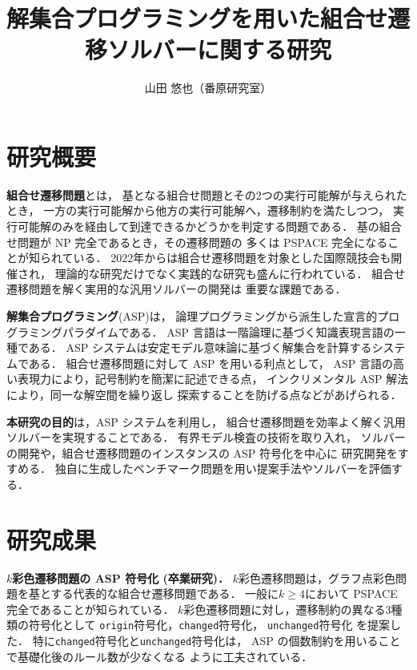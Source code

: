 \documentclass[a4j,10pt]{jarticle}
\title{解集合プログラミングを用いた組合せ遷移ソルバーに関する研究}
\author{山田 悠也（番原研究室）}
\date{}
\newcommand{\code}[1]{\lstinline[basicstyle=\ttfamily]{#1}}
\begin{document}
\maketitle
\thispagestyle{empty}
\begin{multicols}{1}

\section{研究概要}
\textbf{組合せ遷移問題}とは，
基となる組合せ問題とその2つの実行可能解が与えられたとき，
一方の実行可能解から他方の実行可能解へ，遷移制約を満たしつつ，
実行可能解のみを経由して到達できるかどうかを判定する問題である．
基の組合せ問題が NP 完全であるとき，その遷移問題の
多くは PSPACE 完全になることが知られている．
2022年からは組合せ遷移問題を対象とした国際競技会も開催され，
理論的な研究だけでなく実践的な研究も盛んに行われている．
組合せ遷移問題を解く実用的な汎用ソルバーの開発は
重要な課題である．

\textbf{解集合プログラミング}(ASP)は，
論理プログラミングから派生した宣言的プログラミングパラダイムである．
ASP 言語は一階論理に基づく知識表現言語の一種である．
ASP システムは安定モデル意味論に基づく解集合を計算するシステムである．
組合せ遷移問題に対して ASP を用いる利点として，
ASP 言語の高い表現力により，記号制約を簡潔に記述できる点，
インクリメンタル ASP 解法により，同一な解空間を繰り返し
探索することを防げる点などがあげられる．

\textbf{本研究の目的}は，ASP システムを利用し，
組合せ遷移問題を効率よく解く汎用ソルバーを実現することである．
有界モデル検査の技術を取り入れ，
ソルバーの開発や，組合せ遷移問題のインスタンスの ASP 符号化を中心に
研究開発をすすめる．
独自に生成したベンチマーク問題を用い提案手法やソルバーを評価する．

\section{研究成果}
\textbf{$k$彩色遷移問題の ASP 符号化 (卒業研究)．}
$k$彩色遷移問題は，グラフ点彩色問題を基とする代表的な組合せ遷移問題である．
一般に$k \ge 4$において PSPACE 完全であることが知られている．
$k$彩色遷移問題に対し，遷移制約の異なる3種類の符号化として
\code{origin}符号化，\code{changed}符号化，
\code{unchanged}符号化
を提案した．
特に\code{changed}符号化と\code{unchanged}符号化は，
ASP の個数制約を用いることで基礎化後のルール数が少なくなる
ように工夫されている．


\end{multicols}
\end{document}
